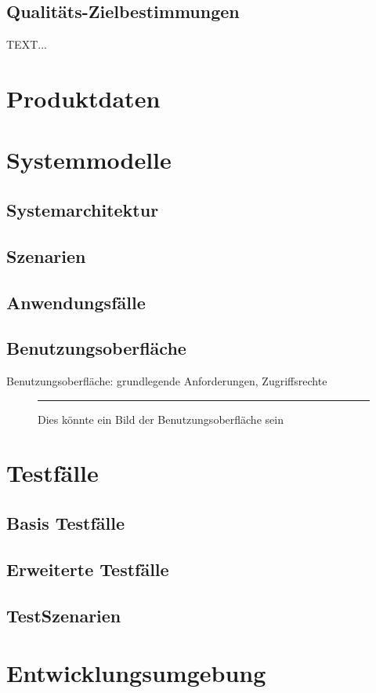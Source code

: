\documentclass[a4paper]{scrreprt}
\begin{document}
\section{Qualitäts-Zielbestimmungen}
TEXT...

\chapter{Produktdaten}

\chapter{Systemmodelle}
\section{Systemarchitektur}
\section{Szenarien}
\section{Anwendungsfälle}
\section{Benutzungsoberfläche}
Benutzungsoberfläche: grundlegende Anforderungen, Zugriffsrechte
 
\begin{figure}[ht]
  \centering
  \rule{8cm}{6cm}
  \caption{Dies könnte ein Bild der Benutzungsoberfläche sein}
\end{figure}

\chapter{Testfälle}
\section{Basis Testfälle}
\section{Erweiterte Testfälle}
\section{TestSzenarien}
 

\chapter{Entwicklungsumgebung}
 
\end{document}
